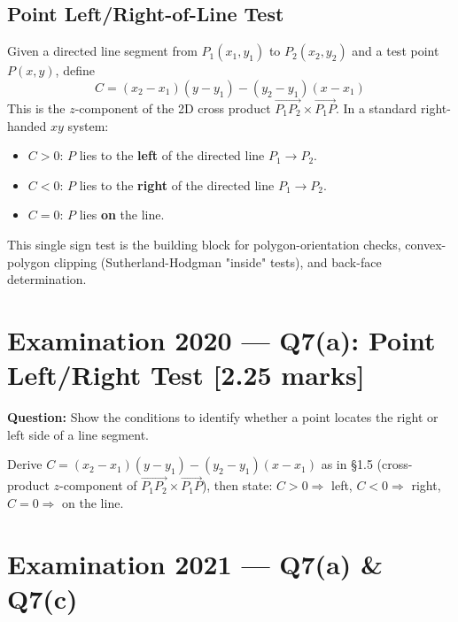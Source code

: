 \documentclass[12pt, a4paper]{article}
\newenvironment{solutionbox}{\begin{mdframed}[style=solutionframe]}{\end{mdframed}}
\newenvironment{answerbox}{\begin{mdframed}[style=answerframe]}{\end{mdframed}}
\begin{document}
\subsection{Point Left/Right-of-Line Test}
\begin{answerbox}
Given a directed line segment from $P_1(x_1,y_1)$ to $P_2(x_2,y_2)$ and a test point $P(x,y)$, define
$$C = (x_2-x_1)(y-y_1) - (y_2-y_1)(x-x_1)$$
This is the $z$-component of the 2D cross product $\overrightarrow{P_1P_2}\times\overrightarrow{P_1P}$. In a standard right-handed $xy$ system:
\begin{itemize}[noitemsep]
  \item $C>0$: $P$ lies to the \textbf{left} of the directed line $P_1\to P_2$.
  \item $C<0$: $P$ lies to the \textbf{right} of the directed line $P_1\to P_2$.
  \item $C=0$: $P$ lies \textbf{on} the line.
\end{itemize}
This single sign test is the building block for polygon-orientation checks, convex-polygon clipping (Sutherland-Hodgman "inside" tests), and back-face determination.
\end{answerbox}

\section{Examination 2020 --- Q7(a): Point Left/Right Test [2.25 marks]}
\begin{solutionbox}
\textbf{Question:} Show the conditions to identify whether a point locates the right or left side of a line segment.
\end{solutionbox}
\begin{answerbox}
Derive $C=(x_2-x_1)(y-y_1)-(y_2-y_1)(x-x_1)$ as in \S1.5 (cross-product $z$-component of $\overrightarrow{P_1P_2}\times\overrightarrow{P_1P}$), then state: $C>0\Rightarrow$ left, $C<0\Rightarrow$ right, $C=0\Rightarrow$ on the line.
\end{answerbox}

\section{Examination 2021 --- Q7(a) \& Q7(c)}
\end{document}
